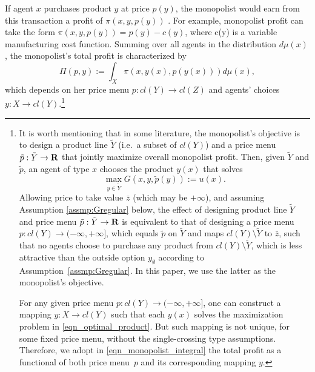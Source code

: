 If agent $x$ purchases product $y$ at price $p(y)$, the monopolist would earn from this transaction a profit of $\pi(x,y,p(y))$%
.  {For example, monopolist profit can take the form $\pi(x,y,p(y)) = p(y)-c(y)$, where %
c(y) is a variable manufacturing cost function.} Summing over all agents in the distribution $d\mu(x)$, the monopolist's total profit is characterized by 
\begin{equation}\label{eqn_monopolist_integral}
	\Pi(p, y):=\int_{X} \pi(x, y(x), p(y(x))) d\mu(x),
\end{equation}
which depends on her price menu $p: cl(Y) \rightarrow cl(Z)$ and  agents' choices $y: X \rightarrow cl(Y)$.\footnote{It is worth mentioning that in some literature, the monopolist's objective is to design a product line $\tilde{Y}$ (i.e.~a subset of $cl(Y)$) and a price menu $\tilde{p}: \tilde{Y} \rightarrow {\mathbf R}$ that jointly maximize overall monopolist profit. Then, given $\tilde{Y}$ and $\tilde{p}$, an agent of type $x$ chooses the product $y(x)$ that solves
	\begin{equation*}
		\max_{y \in \tilde{Y}} G(x,y, \tilde{p}(y)):= u(x).
	\end{equation*}
Allowing price to take value $\bar{z}$ (which may be $+\infty$), and assuming Assumption \ref{assmp:Gregular} below, the effect of designing product line $\tilde{Y}$ and price menu $\tilde{p}: \tilde{Y}\rightarrow {\mathbf R}$ is equivalent to that of designing a price menu $p : cl(Y)\rightarrow (-\infty, +\infty]$, which equals $\tilde{p}$ on $\tilde{Y}$ and maps $cl(Y) \setminus \tilde{Y}$ to $\bar{z}$, such that no agents choose to purchase any product from $cl(Y) \setminus \tilde{Y}$, which is less attractive than the outside option $y_{\emptyset}$ according to Assumption~\ref{assmp:Gregular}. In this paper, we use the latter as the monopolist's objective.
 \vspace{0.1cm}
 
For any given price menu $p: cl(Y)\rightarrow (-\infty, +\infty]$, one can construct a mapping $y: X \rightarrow cl(Y)$ such that each $y(x)$ solves the maximization problem in \eqref{eqn_optimal_product}. But such mapping is not unique, for some fixed price menu, without the single-crossing type assumptions. %
Therefore, we adopt in \eqref{eqn_monopolist_integral} the total profit as a functional of both price menu~$p$ and its corresponding mapping $y$.}\medskip

